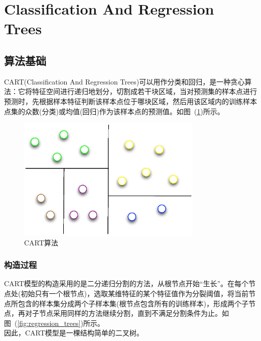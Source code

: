 \documentclass[a4paper,11pt,         %
               ]{article}
\begin{document}
\section{Classification And Regression Trees}

\subsection{算法基础}

CART(Classification And Regression Trees)可以用作分类和回归，是一种贪心算法：它将特征空间进行递归地划分，切割成若干块区域，当对预测集的样本点进行预测时，先根据样本特征判断该样本点位于哪块区域，然后用该区域内的训练样本点集的众数(分类)或均值(回归)作为该样本点的预测值。如图~(\ref{fig:cart_cut})所示。

\begin{figure}[htbp]
\centering\includegraphics[width=3.5in]{img/cart_cut.eps}
\caption{CART算法}\label{fig:cart_cut}
\end{figure}

\subsubsection{构造过程}

CART模型的构造采用的是二分递归分割的方法，从根节点开始“生长”。在每个节点处(初始只有一个根节点)，选取某维特征的某个特征值作为分裂阈值，将当前节点所包含的样本集分成两个子样本集(根节点包含所有的训练样本)，形成两个子节点，再对子节点采用同样的方法继续分割，直到不满足分割条件为止。如图~(\ref{fig:regression_trees})所示。 \\

因此，CART模型是一棵结构简单的二叉树。 
\end{document}
